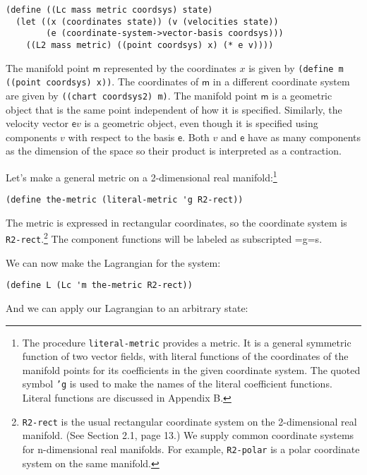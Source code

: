 \documentclass[11pt]{article}
\begin{document}
\begin{verbatim}
(define ((Lc mass metric coordsys) state)
  (let ((x (coordinates state)) (v (velocities state))
        (e (coordinate-system->vector-basis coordsys)))
    ((L2 mass metric) ((point coordsys) x) (* e v))))
\end{verbatim}

The manifold point \(\mathsf{m}\) represented by the coordinates \(x\) is given
by \texttt{(define m ((point coordsys) x))}. The coordinates of \(\mathsf{m}\) in a
different coordinate system are given by \texttt{((chart coordsys2) m)}. The
manifold point \(\mathsf{m}\) is a geometric object that is the same point
independent of how it is specified. Similarly, the velocity vector
\(\mathsf{e}v\) is a geometric object, even though it is specified using
components \(v\) with respect to the basis \(\mathsf{e}\). Both \(v\) and
\(\mathsf{e}\) have as many components as the dimension of the space so their
product is interpreted as a contraction.

Let's make a general metric on a 2-dimensional real manifold:\footnote{The procedure \texttt{literal-metric} provides a metric. It is a general
symmetric function of two vector fields, with literal functions of the
coordinates of the manifold points for its coefficients in the given coordinate
system. The quoted symbol \texttt{'g} is used to make the names of the literal
coefficient functions. Literal functions are discussed in Appendix B.}

\begin{verbatim}
(define the-metric (literal-metric 'g R2-rect))
\end{verbatim}

The metric is expressed in rectangular coordinates, so the coordinate system
is \texttt{R2-rect}.\footnote{\texttt{R2-rect} is the usual rectangular coordinate system on the 2-dimensional
real manifold. (See Section 2.1, page 13.) We supply common coordinate systems
for n-dimensional real manifolds. For example, \texttt{R2-polar} is a polar coordinate
system on the same manifold.} The component functions will be labeled as subscripted
=g=s.

We can now make the Lagrangian for the system:

\begin{verbatim}
(define L (Lc 'm the-metric R2-rect))
\end{verbatim}

And we can apply our Lagrangian to an arbitrary state:
\end{document}
